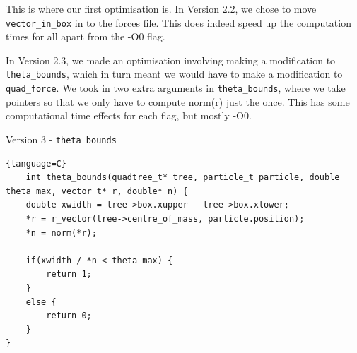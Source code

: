 \documentclass{article}
\begin{document}
This is where our first optimisation is. In Version 2.2, we chose to move \verb|vector_in_box| in to the forces file. This does indeed speed up the computation times for all apart from the -O0 flag.\vspace{0.3cm}

In Version 2.3, we made an optimisation involving making a modification to \verb|theta_bounds|, which in turn meant we would have to make a modification to \verb|quad_force|. We took in two extra arguments in \verb|theta_bounds|, where we take pointers so that we only have to compute norm(r) just the once. This has some computational time effects for each flag, but mostly -O0.\vspace{0.3cm}
\begin{center}
    Version 3 - \verb|theta_bounds|
\end{center}
\begin{lstlisting}{language=C}
    int theta_bounds(quadtree_t* tree, particle_t particle, double theta_max, vector_t* r, double* n) {
    double xwidth = tree->box.xupper - tree->box.xlower;
    *r = r_vector(tree->centre_of_mass, particle.position);
    *n = norm(*r);

    if(xwidth / *n < theta_max) {
        return 1;
    }
    else {
        return 0;
    }
}
\end{lstlisting}
\end{document}
